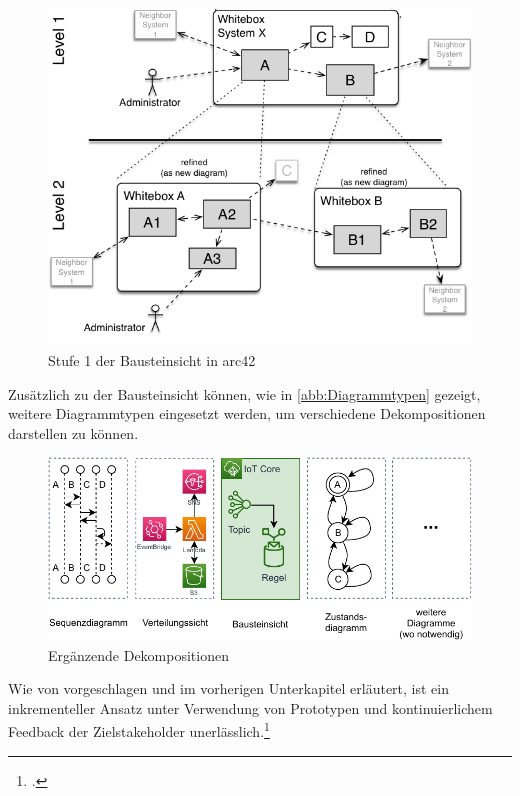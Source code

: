 \begin{figure}[H]
\centering
\includegraphics[height=0.38\textheight]{graphics/Bausteinsicht.png}
\caption[Stufe 1 der Bausteinsicht in arc42]{Stufe 1 der Bausteinsicht in arc42\footnotemark}
\label{abb:BausteinsichtStufe1}
\end{figure}

Zusätzlich zu der Bausteinsicht können, wie in \autoref{abb:Diagrammtypen} gezeigt, weitere Diagrammtypen eingesetzt werden, um verschiedene Dekompositionen darstellen zu können.

\begin{figure}[H]
\centering
\includegraphics[width=\textwidth]{graphics/Diagrammtypen.pdf}
\caption{Ergänzende Dekompositionen}
\label{abb:Diagrammtypen}
\end{figure}


Wie von \citeauthor{Muller.2020} vorgeschlagen und im vorherigen Unterkapitel erläutert, ist ein inkrementeller Ansatz unter Verwendung von Prototypen und kontinuierlichem Feedback der Zielstakeholder unerlässlich.\footcite[Vgl.][7]{Muller.2020} 

